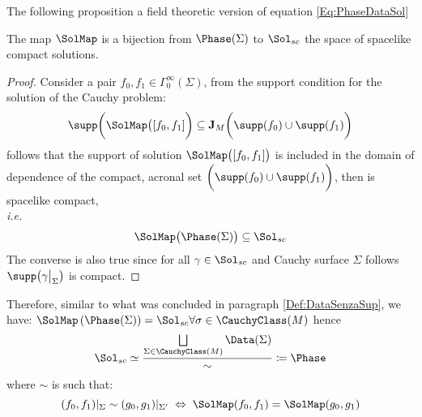 \documentclass[Main]{subfiles}
\begin{document}
			The following proposition a field theoretic version of equation \ref{Eq:PhaseDataSol}
			\begin{proposition}
				The map $\SolMap$ is a bijection from $\Phase(\Sigma)$ to $\Sol_{sc}$ the space of spacelike compact solutions.			
			\end{proposition}
			\begin{proof}
				Consider a pair $f_0, f_1 \in \Gamma_0^\infty(\Sigma)$, from the support condition for the solution of the Cauchy problem:
				\danger
				\begin{equation}\label{Eq:SupportoCauchySol}
					\supp\biggr( \SolMap \big([f_0,f_1] \biggr) \subseteq \mathbf{J}_M \biggr( \supp(f_0) \cup \supp(f_1) \biggr)
				\end{equation}
				follows that the support of solution $\SolMap \big([f_0,f_1]\big) $	is included in the domain of dependence of the compact, acronal	set $\biggr( \supp(f_0) \cup \supp(f_1) \biggr)$, then is spacelike compact,\\ \textit{i.e.}
				\begin{displaymath}
					\SolMap \big( \Phase(\Sigma)\big) \subseteq \Sol_{sc}
				\end{displaymath}
				The converse is also true since for all $\gamma \in \Sol_{sc}$ and Cauchy surface $\Sigma$ follows $\supp\big( \gamma \big\vert_\Sigma \big)$ is compact.
			\end{proof}
			Therefore, similar to what was concluded in paragraph  \ref{Def:DataSenzaSup}, we have:
			$ \SolMap \left( \Phase(\Sigma) \right) = \Sol_{sc} \forall \sigma \in \CauchyClass(M)$
			hence
			\begin{equation}
				\Sol_{sc} \simeq \frac{\bigsqcup\limits_{\Sigma \in \CauchyClass(M)}\Data(\Sigma)}{\sim} \coloneqq \Phase
			\end{equation}
				where $\sim$ is such that:
				\begin{displaymath}
					(f_0, f_1)|_\Sigma \sim (g_0, g_1)|_{\Sigma'} \; \Leftrightarrow \; \SolMap(f_0,f_1) =  \SolMap(g_0,g_1) 
				\end{displaymath}
\end{document}

